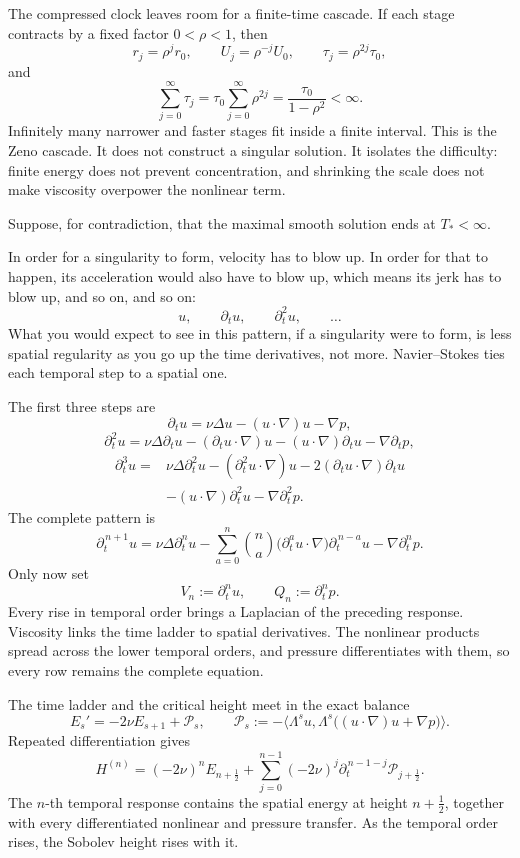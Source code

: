 \documentclass[11pt]{article}
\begin{document}
The compressed clock leaves room for a finite-time cascade. If each stage contracts by a fixed factor \(0<\rho<1\), then
\[
r_j=\rho^jr_0,
\qquad
U_j=\rho^{-j}U_0,
\qquad
\tau_j=\rho^{2j}\tau_0,
\]
and
\[
\sum_{j=0}^{\infty}\tau_j
=\tau_0\sum_{j=0}^{\infty}\rho^{2j}
=\frac{\tau_0}{1-\rho^2}<\infty.
\]
Infinitely many narrower and faster stages fit inside a finite interval. This is the Zeno cascade. It does not construct a singular solution. It isolates the difficulty: finite energy does not prevent concentration, and shrinking the scale does not make viscosity overpower the nonlinear term.

Suppose, for contradiction, that the maximal smooth solution ends at \(T_*<\infty\).

In order for a singularity to form, velocity has to blow up. In order for that to happen, its acceleration would also have to blow up, which means its jerk has to blow up, and so on, and so on:
\[
u,\qquad \partial_tu,\qquad \partial_t^2u,\qquad \ldots
\]
What you would expect to see in this pattern, if a singularity were to form, is less spatial regularity as you go up the time derivatives, not more. Navier--Stokes ties each temporal step to a spatial one.

The first three steps are
\[
\partial_tu
=\nu\Delta u-(u\cdot\nabla)u-\nabla p,
\]
\[
\partial_t^2u
=\nu\Delta\partial_tu
-(\partial_tu\cdot\nabla)u
-(u\cdot\nabla)\partial_tu
-\nabla\partial_tp,
\]
\[
\begin{aligned}
\partial_t^3u={}&\nu\Delta\partial_t^2u
-(\partial_t^2u\cdot\nabla)u
-2(\partial_tu\cdot\nabla)\partial_tu \\
&-(u\cdot\nabla)\partial_t^2u
-\nabla\partial_t^2p.
\end{aligned}
\]
The complete pattern is
\[
\partial_t^{\,n+1}u
=\nu\Delta\partial_t^nu
-\sum_{a=0}^{n}\binom na
\bigl(\partial_t^au\cdot\nabla\bigr)\partial_t^{\,n-a}u
-\nabla\partial_t^np.
\]
Only now set
\[
V_n:=\partial_t^nu,
\qquad
Q_n:=\partial_t^np.
\]
Every rise in temporal order brings a Laplacian of the preceding response. Viscosity links the time ladder to spatial derivatives. The nonlinear products spread across the lower temporal orders, and pressure differentiates with them, so every row remains the complete equation.

The time ladder and the critical height meet in the exact balance
\[
E_s'=-2\nu E_{s+1}+\mathcal P_s,
\qquad
\mathcal P_s
:=-\bigl\langle\Lambda^su,
\Lambda^s\bigl((u\cdot\nabla)u+\nabla p\bigr)\bigr\rangle.
\]
Repeated differentiation gives
\[
H^{(n)}
=(-2\nu)^nE_{n+\frac12}
+\sum_{j=0}^{n-1}(-2\nu)^j
\partial_t^{\,n-1-j}\mathcal P_{j+\frac12}.
\]
The \(n\)-th temporal response contains the spatial energy at height \(n+\tfrac12\), together with every differentiated nonlinear and pressure transfer. As the temporal order rises, the Sobolev height rises with it.
\end{document}

